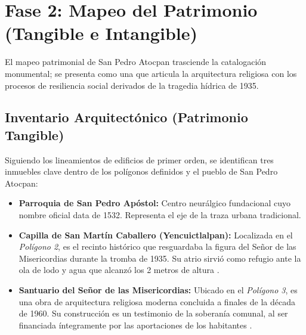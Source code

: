 
\section{Fase 2: Mapeo del Patrimonio (Tangible e Intangible)}
\label{sec:mapeo-patrimonial}

El mapeo patrimonial de San Pedro Atocpan trasciende la catalogación monumental; 
se presenta como una  que articula la arquitectura religiosa con los 
procesos de resiliencia social derivados de la tragedia hídrica de 1935.

\subsection{Inventario Arquitectónico (Patrimonio Tangible)}
\label{ssec:inventario-arquitectonico}

Siguiendo los lineamientos de edificios de primer orden, se identifican tres inmuebles 
clave dentro de los polígonos definidos y el pueblo de San Pedro Atocpan:

\begin{itemize}
    \item \textbf{Parroquia de San Pedro Apóstol:} Centro neurálgico fundacional cuyo nombre 
            oficial data de 1532. Representa el eje de la traza urbana tradicional.
    \item \textbf{Capilla de San Martín Caballero (Yencuictlalpan):} Localizada en el 
            \textit{Polígono 2}, es el recinto histórico que resguardaba 
            la figura del Señor de las Misericordias durante la tromba de 1935. 
            Su atrio sirvió como refugio ante la ola de lodo y agua que alcanzó 
            los 2 metros de altura  \cite{atocpan2026relato}.
    \item \textbf{Santuario del Señor de las Misericordias:} Ubicado en el 
            \textit{Polígono 3}, es una obra de arquitectura religiosa moderna concluida 
            a finales de la década de 1960. Su construcción es un testimonio de la soberanía comunal, 
            al ser financiada íntegramente por las aportaciones de los habitantes \cite{santuarioSFtesoro}.
\end{itemize}

